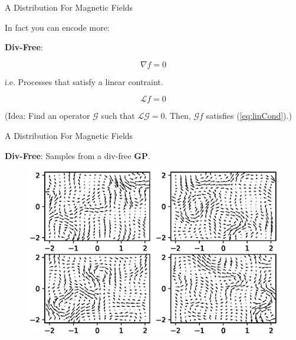 \documentclass{beamer}
\begin{document}
\begin{frame}{A Distribution For Magnetic Fields}

  In fact you can encode more:

  \vspace{1em}

  \textbf{Div-Free}:

  \begin{equation*}
    \nabla f = 0
  \end{equation*}

  i.e. Processes that satisfy a linear contraint.

  \begin{equation}\label{eq:linCond}
    \mathcal{L}f = 0
  \end{equation}

  (Idea: Find an operator $\mathcal{G}$ such that $\mathcal{L}\mathcal{G} = 0$. Then, $\mathcal{G}f$ satisfies (\ref{eq:linCond}).)
\end{frame}

\begin{frame}{A Distribution For Magnetic Fields}

  \textbf{Div-Free}: Samples from a div-free \textbf{GP}.

  \begin{figure}
    \includegraphics[width=\linewidth]{plots/div_free.eps}
  \end{figure}

\end{frame}
\end{document}
